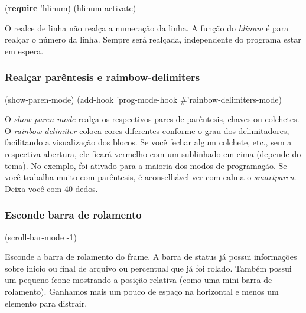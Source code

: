 \documentclass[]{article}
\newenvironment{Shaded}{}{}
\newcommand{\KeywordTok}[1]{\textcolor[rgb]{0.00,0.44,0.13}{\textbf{{#1}}}}
\newcommand{\DecValTok}[1]{\textcolor[rgb]{0.25,0.63,0.44}{{#1}}}
\newcommand{\NormalTok}[1]{{#1}}
\begin{document}
\begin{Shaded}
\begin{Highlighting}[]
\NormalTok{(}\KeywordTok{require} \NormalTok{'hlinum)}
\NormalTok{(hlinum-activate)}
\end{Highlighting}
\end{Shaded}

O realce de linha não realça a numeração da linha. A função do
\emph{hlinum} é para realçar o número da linha. Sempre será realçada,
independente do programa estar em espera.

\subsubsection{Realçar parêntesis e
raimbow-delimiters}\label{realuxe7ar-paruxeantesis-e-raimbow-delimiters}

\begin{Shaded}
\begin{Highlighting}[]
\NormalTok{(show-paren-mode)}
\NormalTok{(add-hook 'prog-mode-hook #'rainbow-delimiters-mode)}
\end{Highlighting}
\end{Shaded}

O \emph{show-paren-mode} realça os respectivos pares de parêntesis,
chaves ou colchetes. O \emph{rainbow-delimiter} coloca cores diferentes
conforme o grau dos delimitadores, facilitando a visualização dos
blocos. Se você fechar algum colchete, etc., sem a respectiva abertura,
ele ficará vermelho com um sublinhado em cima (depende do tema). No
exemplo, foi ativado para a maioria dos modos de programação. Se você
trabalha muito com parêntesis, é aconselhável ver com calma o
\emph{smartparen}. Deixa você com 40 dedos.

\subsubsection{Esconde barra de
rolamento}\label{esconde-barra-de-rolamento}

\begin{Shaded}
\begin{Highlighting}[]
\NormalTok{(scroll-bar-mode -}\DecValTok{1}\NormalTok{)}
\end{Highlighting}
\end{Shaded}

Esconde a barra de rolamento do frame. A barra de status já possui
informações sobre inicio ou final de arquivo ou percentual que já foi
rolado. Também possui um pequeno ícone mostrando a posição relativa
(como uma mini barra de rolamento). Ganhamos mais um pouco de espaço na
horizontal e menos um elemento para distrair.
\end{document}
